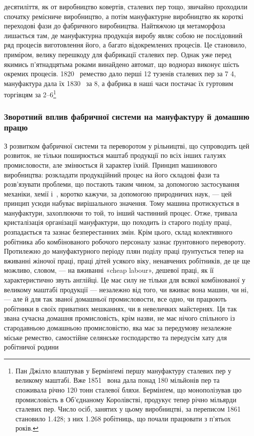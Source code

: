 \parcont{}  %
десятиліття, як от виробництво ковертів, сталевих пер тощо, звичайно
проходили спочатку ремісниче виробництво, а потім мануфактурне
виробництво як короткі переходові фази до фабричного
виробництва. Найтяжчою ця метаморфоза лишається там, де мануфактурна
продукція виробу являє собою не послідовний ряд процесів
виготовлення його, а багато відокремлених процесів. Це становило,
приміром, велику перешкоду для фабрикації сталевих пер.
Однак уже перед якимись п’ятнадцятьма роками винайдено автомат,
що воднораз виконує шість окремих процесів. 1820~ ремество
дало перші 12 тузенів сталевих пер за 7 4,
мануфактура дала їх 1830~ за 8, а фабрика в
наші часи постачає їх гуртовим торгівцям за 2--6\footnote{
Пан Джілло влаштував у Бермінґемі першу мануфактуру сталевих
пер у великому маштабі. Вже 1851~ вона дала понад 180 мільйонів пер
та споживала річно 120 тонн сталевої бляхи. Бермінґем, що монополізував
цю промисловість в Об’єднаному Королівстві, продукує тепер річно
мільярди сталевих пер. Число осіб, занятих у цьому виробництві, за
переписом 1861~ становило \num{1.428}; з них \num{1.268} робітниць, що почали
працювати з п’ятьох років.
}

\subsubsection{Зворотний вплив фабричної системи
на мануфактуру й домашню працю}

З розвитком фабричної системи та переворотом у рільництві, що
супроводить цей розвиток, не тільки поширюється маштаб продукції
по всіх інших галузях промисловости, але змінюється й характер
їхній. Принцип машинового виробництва: розкладати продукційний
процес на його складові фази та розв’язувати проблеми,
що постають таким чином, за допомогою застосування механіки,
хемії і~, коротко кажучи, за допомогою природничих наук, —
цей принцип усюди набуває вирішального значення. Тому машина
протискується в мануфактури, захоплюючи то той, то інший
частинний процес. Отже, тривала кристалізація організації мануфактури,
що походить із старого поділу праці, розпадається
та зазнає безперестанних змін. Крім цього, склад колективного
робітника або комбінованого робочого персоналу зазнає ґрунтовного
перевороту. Протилежно до мануфактурного періоду
плян поділу праці ґрунтується тепер на вживанні жіночої праці,
праці дітей усякого віку, ненавчених робітників, де це ще
можливо, словом, — на вживанні «cheap labour», дешевої праці,
як її характеристично звуть англійці. Це має силу не тільки для
всякої комбінованої у великому маштабі продукції — незалежно
від того, чи вживає вона машин, чи ні, — але й для так званої
домашньої промисловости, все одно, чи працюють робітники в
своїх приватних мешканнях, чи в невеличких майстернях. Ця
так звана сучасна домашня промисловість, крім назви, не має
нічого спільного із стародавньою домашньою промисловістю,
яка має за передумову незалежне міське ремество, самостійне
селянське господарство та передусім хату для робітничої родини
\parbreak{}  %
